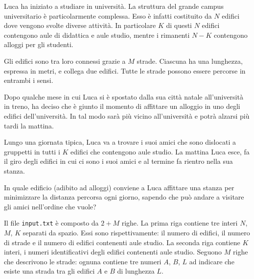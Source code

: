 \usepackage{xcolor}
\usepackage{afterpage}
\usepackage{pifont,mdframed}
\usepackage[bottom,symbol]{footmisc}

\makeatletter
\gdef\this@inputfilename{input.txt}
\gdef\this@outputfilename{output.txt}
\makeatother


\newcommand{\inputfile}{\texttt{input.txt}}
\newcommand{\outputfile}{\texttt{output.txt}}


Luca ha iniziato a studiare in università. La struttura del grande campus universitario è particolarmente complessa. Esso è infatti costituito da $N$ edifici dove vengono svolte diverse attività. In particolare $K$ di questi $N$ edifici contengono aule di didattica e aule studio, mentre i rimanenti $N-K$ contengono alloggi per gli studenti.

Gli edifici sono tra loro connessi grazie a $M$ strade. Ciascuna ha una lunghezza, espressa in metri, e collega due edifici. Tutte le strade possono essere percorse in entrambi i sensi.

Dopo qualche mese in cui Luca si è spostato dalla sua città natale all'università in treno, ha deciso che è giunto il momento di affittare un alloggio in uno degli edifici dell'università. In tal modo sarà più vicino all'università e potrà alzarsi più tardi la mattina.

Lungo una giornata tipica, Luca va a trovare i suoi amici che sono dislocati a gruppetti in tutti i $K$ edifici che contengono aule studio. La mattina Luca esce, fa il giro degli edifici in cui ci sono i suoi amici e al termine fa rientro nella sua stanza.

In quale edificio (adibito ad alloggi) conviene a Luca affittare una stanza per minimizzare la distanza percorsa ogni giorno, sapendo che può andare a visitare gli amici nell'ordine che vuole?

\Input
Il file \inputfile{} è composto da $2+M$ righe. La prima riga contiene tre interi $N$, $M$, $K$ separati da spazio. Essi sono rispettivamente: il numero di edifici, il numero di strade e il numero di edifici contenenti aule studio.
La seconda riga contiene $K$ interi, i numeri identificativi degli edifici contenenti aule studio.
Seguono $M$ righe che descrivono le strade: ognuna contiene tre numeri $A$, $B$, $L$ ad indicare che esiste una strada tra gli edifici $A$ e $B$ di lunghezza $L$.

